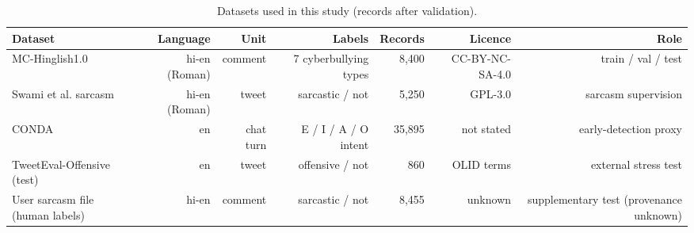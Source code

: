 \begin{table}[t]
\centering
\small
\caption{Datasets used in this study (records after validation).}
\label{tab:tab01_datasets}
\begin{tabular}{lrrrrrr}
\toprule
Dataset & Language & Unit & Labels & Records & Licence & Role \\
\midrule
MC-Hinglish1.0 & hi-en (Roman) & comment & 7 cyberbullying types & 8,400 & CC-BY-NC-SA-4.0 & train / val / test \\
Swami et al. sarcasm & hi-en (Roman) & tweet & sarcastic / not & 5,250 & GPL-3.0 & sarcasm supervision \\
CONDA & en & chat turn & E / I / A / O intent & 35,895 & not stated & early-detection proxy \\
TweetEval-Offensive (test) & en & tweet & offensive / not & 860 & OLID terms & external stress test \\
User sarcasm file (human labels) & hi-en & comment & sarcastic / not & 8,455 & unknown & supplementary test (provenance unknown) \\
\bottomrule
\end{tabular}
\end{table}
